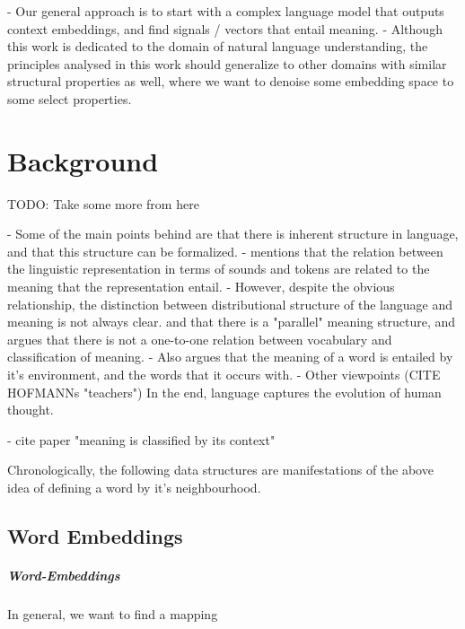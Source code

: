 \documentclass[a4paper,12pt,twoside,openright]{report}
\begin{document}
- Our general approach is to start with a complex language model that outputs context embeddings, and find signals / vectors that entail meaning.
- Although this work is dedicated to the domain of natural language understanding, the principles analysed in this work should generalize to other domains with similar structural properties as well, where we want to denoise some embedding space to some select properties.


\chapter{Background} 

TODO: Take some more from here

- Some of the main points behind \cite{harris54} are that there is inherent structure in language, and that this structure can be formalized.
- \cite{harris54} mentions that the relation between the linguistic representation in terms of sounds and tokens are related to the meaning that the representation entail.
- However, despite the obvious relationship, the distinction between distributional structure of the language and meaning is not always clear. and that there is a "parallel" meaning structure, and argues that there is not a one-to-one relation between vocabulary and classification of meaning. 
- Also argues that the meaning of a word is entailed by it's environment, and the words that it occurs with.
- Other viewpoints (CITE HOFMANNs "teachers") In the end, language captures the evolution of human thought.

- cite paper "meaning is classified by its context"

Chronologically, the following data structures are manifestations of the above idea of defining a word by it's neighbourhood.

\section{Word Embeddings}

\paragraph{Word-Embeddings}
In general, we want to find a mapping 
\end{document}

